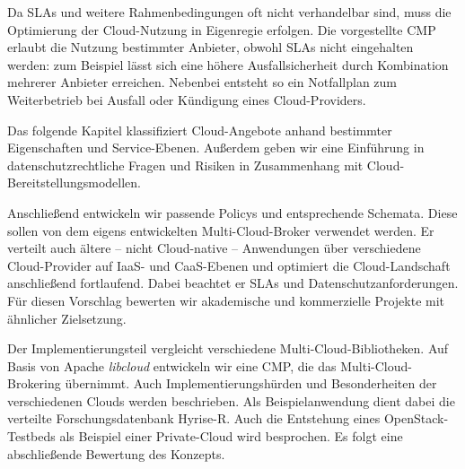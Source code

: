 
Da SLAs und weitere Rahmenbedingungen oft nicht verhandelbar sind, muss die Optimierung der Cloud-Nutzung in Eigenregie erfolgen.  Die vorgestellte CMP erlaubt die Nutzung bestimmter Anbieter, obwohl SLAs  nicht eingehalten werden: zum Beispiel lässt sich eine höhere Ausfallsicherheit durch Kombination mehrerer Anbieter erreichen. Nebenbei entsteht so ein Notfallplan zum Weiterbetrieb bei Ausfall oder Kündigung eines Cloud-Providers.

Das folgende Kapitel klassifiziert Cloud-Angebote anhand bestimmter Eigenschaften und Service-Ebenen. Außerdem geben wir eine Einführung in datenschutzrechtliche Fragen und Risiken in Zusammenhang mit Cloud-Bereit\-stel\-lungs\-model\-len.

Anschließend entwickeln wir passende Policys und entsprechende Schemata. Diese sollen von dem eigens entwickelten Multi-Cloud-Broker verwendet werden. Er verteilt auch ältere -- nicht Cloud-native -- Anwendungen über verschiedene Cloud-Provider auf IaaS- und CaaS-Ebenen und optimiert die Cloud-Landschaft anschließend fortlaufend. Dabei beachtet er SLAs und Datenschutzanforderungen. Für diesen Vorschlag bewerten wir akademische und kommerzielle Projekte mit ähnlicher Zielsetzung.

Der Implementierungsteil vergleicht verschiedene Multi-Cloud-Bibliotheken. Auf Basis von Apache \emph{libcloud} entwickeln wir eine CMP, die das Multi-Cloud-Brokering übernimmt. Auch Implementierungshürden und Besonderheiten der verschiedenen Clouds werden beschrieben. Als Beispielanwendung dient dabei die verteilte Forschungsdatenbank Hyrise-R. Auch die Entstehung eines OpenStack-Testbeds als Beispiel einer Private-Cloud wird besprochen. Es folgt eine abschließende Bewertung des Konzepts.


